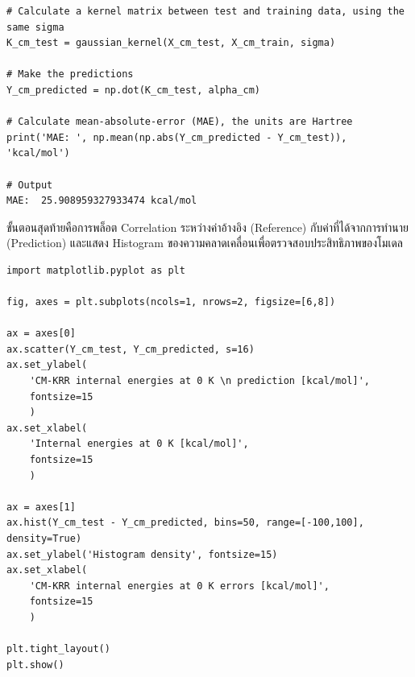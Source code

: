 \begin{lstlisting}[style=MyPython]
# Calculate a kernel matrix between test and training data, using the same sigma
K_cm_test = gaussian_kernel(X_cm_test, X_cm_train, sigma)

# Make the predictions
Y_cm_predicted = np.dot(K_cm_test, alpha_cm)

# Calculate mean-absolute-error (MAE), the units are Hartree
print('MAE: ', np.mean(np.abs(Y_cm_predicted - Y_cm_test)), 'kcal/mol')

# Output
MAE:  25.908959327933474 kcal/mol
\end{lstlisting}

\vspace{1em}

ขั้นตอนสุดท้ายคือการพล็อต Correlation ระหว่างค่าอ้างอิง (Reference) กับค่าที่ได้จากการทำนาย (Prediction) และแสดง Histogram ของความคลาดเคลื่อนเพื่อตรวจสอบประสิทธิภาพของโมเดล

\begin{lstlisting}[style=MyPython]
import matplotlib.pyplot as plt

fig, axes = plt.subplots(ncols=1, nrows=2, figsize=[6,8])

ax = axes[0]
ax.scatter(Y_cm_test, Y_cm_predicted, s=16)
ax.set_ylabel(
    'CM-KRR internal energies at 0 K \n prediction [kcal/mol]', 
    fontsize=15
    )
ax.set_xlabel(
    'Internal energies at 0 K [kcal/mol]', 
    fontsize=15
    )

ax = axes[1]
ax.hist(Y_cm_test - Y_cm_predicted, bins=50, range=[-100,100], density=True)
ax.set_ylabel('Histogram density', fontsize=15)
ax.set_xlabel(
    'CM-KRR internal energies at 0 K errors [kcal/mol]', 
    fontsize=15
    )

plt.tight_layout()
plt.show()
\end{lstlisting}

